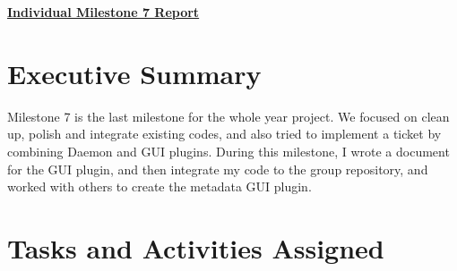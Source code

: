 \documentclass{article}
\begin{document}
\pagestyle{headings}

\begin{center}
{\LARGE\textbf{\underline{{Individual Milestone 7 Report}}}}
\end{center}

\section*{Executive Summary}

Milestone 7 is the last milestone for the whole year project. We focused on clean up, polish and integrate existing codes, and also tried to implement a ticket by combining Daemon and GUI plugins. During this milestone, I wrote a document for the GUI plugin, and then integrate my code to the group repository, and worked with others to create the metadata GUI plugin.

\section*{Tasks and Activities Assigned}
\end{document}
